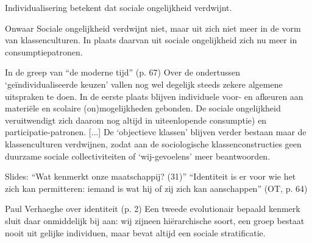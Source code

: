 \documentclass[main.tex]{subfiles}
\begin{document}
\begin{examenvraag}
    \begin{stelling}
        Individualisering betekent dat sociale ongelijkheid verdwijnt.
    \end{stelling}

    \begin{stelling-antwoord}{Onwaar}
        Sociale ongelijkheid verdwijnt niet, maar uit zich niet meer in de vorm van klassenculturen.
        In plaats daarvan uit sociale ongelijkheid zich nu meer in consumptiepatronen.
        \begin{citaat}{In de greep van ``de moderne tijd'' (p. 67)}
            Over de ondertussen `ge\"individualiseerde keuzen' vallen nog wel degelijk steeds zekere algemene uitspraken te doen.
            In de eerste plaats blijven individuele voor- en afkeuren aan materi\"ele en scolaire (on)mogelijkheden gebonden.
            De sociale ongelijkheid veruitwendigt zich daarom nog altijd in uiteenlopende consumptie) en participatie-patronen.
            [...]
            De `objectieve klassen' blijven verder bestaan maar de klassenculturen verdwijnen, zodat aan de sociologische klassenconstructies geen duurzame sociale collectiviteiten of `wij-gevoelens' meer beantwoorden.
        \end{citaat}
        \begin{citaat}{Slides: ``Wat kenmerkt onze maatschappij? (31)''}
            ``Identiteit is er voor wie het zich kan permitteren: iemand is wat hij of zij zich kan aanschappen'' (OT, p. 64)
        \end{citaat}
        \begin{citaat}{Paul Verhaeghe over identiteit (p. 2)}
            Een tweede evolutionair bepaald kenmerk sluit daar onmiddelijk bij aan: wij zijneen hi\"erarchische soort, een groep bestaat nooit uit gelijke individuen, maar bevat altijd een sociale stratificatie.
        \end{citaat}
    \end{stelling-antwoord}
\end{examenvraag}
\end{document}
